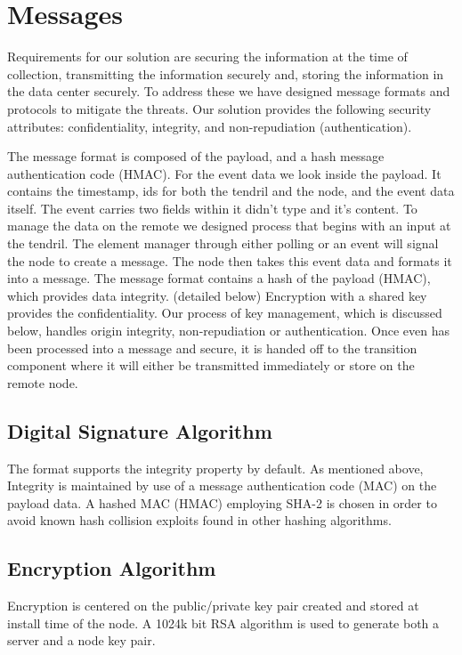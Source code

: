 \section{Messages}
Requirements for our solution are securing the information at the time of collection, transmitting the information securely and, storing the information in the data center securely. To address these we have designed message formats and protocols to mitigate the threats. Our solution provides the following security attributes:  confidentiality, integrity, and non-repudiation (authentication). 

The message format is composed of the payload, and a hash message authentication code (HMAC). For the event data we look inside the payload. It contains the timestamp, ids for both the tendril and the node, and the event data itself. The event carries two fields within it didn’t type and it’s content.  To manage the data on the remote we designed process that begins with an input at the tendril. The element manager through either polling or an event will signal the node to create a message. The node then takes this event data and formats it into a message. The message format contains a hash of the payload (HMAC), which provides data integrity. (detailed below) Encryption with a shared key provides the confidentiality. Our process of key management, which is discussed below, handles origin integrity, non-repudiation or authentication.   Once even has been processed into a message and secure, it is handed off to the transition component where it will either be transmitted immediately or store on the remote node.

\subsection{Digital Signature Algorithm}
The format supports the integrity property by default. As mentioned above, Integrity is maintained by use of a message authentication code (MAC) on the payload data. A hashed MAC (HMAC) employing SHA-2 is chosen in order to avoid known hash collision exploits found in other hashing algorithms. \cite{Turner:MiRyW-r_} 

\subsection{Encryption Algorithm}
Encryption is centered on the public/private key pair created and stored at install time of the node. A 1024k bit RSA algorithm is used to generate both a server and a node key pair. 

